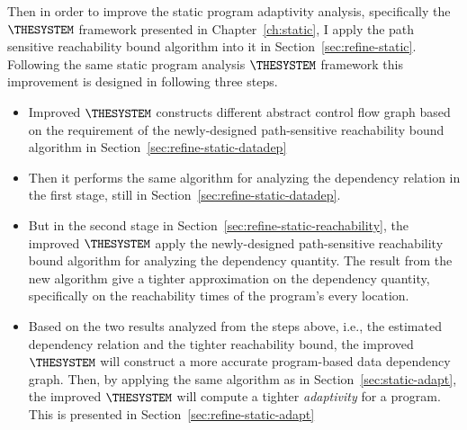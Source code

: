 \begin{enumerate}
    Then in order to improve the static program adaptivity analysis, specifically
    the $\THESYSTEM$ framework presented in Chapter~\ref{ch:static}, I apply the 
    path sensitive reachability bound algorithm into it in Section~\ref{sec:refine-static}.
    Following the same static program analysis $\THESYSTEM$ framework
this improvement is designed in following three steps.
\begin{itemize}
    \item Improved $\THESYSTEM$ constructs different abstract control flow graph based on the requirement of the newly-designed
    path-sensitive reachability bound algorithm in Section~\ref{sec:refine-static-datadep}
    \item Then it performs the same algorithm for analyzing the dependency relation in the first stage, still in Section~\ref{sec:refine-static-datadep}.
    \item But in the second stage in Section~\ref{sec:refine-static-reachability}, the improved $\THESYSTEM$ 
    apply the newly-designed  path-sensitive reachability bound algorithm for analyzing the dependency quantity.
    The result from the new algorithm 
    give a tighter approximation on the dependency quantity,
    specifically on the reachability times of the program's every location.
    \item Based on the two results analyzed from the steps above, 
    i.e., the estimated dependency relation and the tighter reachability bound, 
    the improved $\THESYSTEM$ will construct
a more accurate program-based data dependency graph.
Then, by applying the same algorithm as in Section~\ref{sec:static-adapt}, 
the improved $\THESYSTEM$ will compute a tighter \emph{adaptivity} for a program.
This is presented in Section~\ref{sec:refine-static-adapt}%
\end{itemize}
\end{enumerate}

